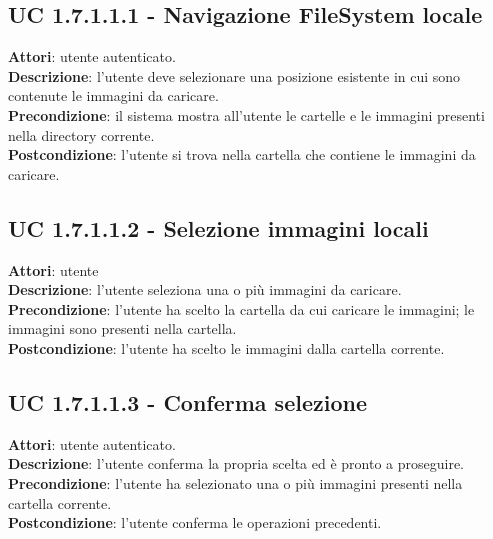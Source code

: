 		\subsection{UC 1.7.1.1.1 - Navigazione FileSystem locale}{
			\label{uc1.7.1.1.1}
			\textbf{Attori}: utente autenticato.\\
			\textbf{Descrizione}: l'utente deve selezionare una posizione esistente in cui sono contenute le immagini da caricare. \\
			\textbf{Precondizione}: il sistema mostra all'utente le cartelle e le immagini presenti nella directory corrente.	\\
			\textbf{Postcondizione}: l'utente si trova nella cartella che contiene le immagini da caricare.	\\
			}
		\subsection{UC 1.7.1.1.2 - Selezione immagini locali}{
			\label{uc1.7.1.1.2}
			\textbf{Attori}: utente \\
			\textbf{Descrizione}: l'utente seleziona una o più immagini da caricare. \\
			\textbf{Precondizione}: l'utente ha scelto la cartella da cui caricare le immagini; le immagini sono presenti nella cartella. \\
			\textbf{Postcondizione}: l'utente ha scelto le immagini dalla cartella corrente.	\\
			}
		\subsection{UC 1.7.1.1.3 - Conferma selezione}{
			\label{uc1.7.1.1.3}
			\textbf{Attori}: utente autenticato.\\
			\textbf{Descrizione}: l'utente conferma la propria scelta ed è pronto a proseguire. \\
			\textbf{Precondizione}: l'utente ha selezionato una o più immagini presenti nella cartella corrente.	\\
			\textbf{Postcondizione}: l'utente conferma le operazioni precedenti.	\\
			}
